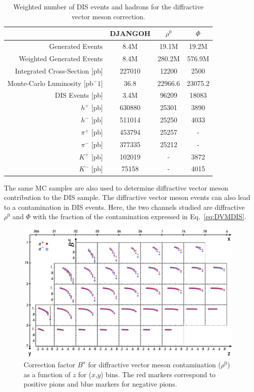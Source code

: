 \begin{table}
	\centering
	\begin{tabular}{rccc}
    \hline
     & DJANGOH & $\rho^0$ & $\Phi$ \\
    \hline
    Generated Events & 8.4M & 19.1M & 19.2M  \\
    Weighted Generated Events & 8.4M & 280.2M & 576.9M  \\
		Integrated Cross-Section [pb] & 227010 & 12200 & 2500  \\
		Monte-Carlo Luminosity [pb$^-1$] & 36.8 & 22966.6 & 23075.2  \\
    \hline
		DIS Events [pb] & 3.4M & 96209 & 18083  \\
		$h^+$ [pb] & 630880 & 25301 & 3890  \\
		$h^-$ [pb] & 511014 & 25250 & 4033  \\
		$\pi^+$ [pb] & 453794 & 25257 & -  \\
		$\pi^-$ [pb] & 377335 & 25212 & -  \\
		$K^+$ [pb] & 102019 & - & 3872  \\
		$K^-$ [pb] & 75158 & - & 4015 \\
  \end{tabular}
  \caption{Weighted number of DIS events and hadrons for the diffractive vector meson correction.}
  \label{DVM}
\end{table}

The same MC samples are also used to determine diffractive vector meson contribution to the DIS sample. The diffractive vector meson events can also lead to a contamination in DIS events. Here, the two channels studied are diffractive $\rho^0$ and $\Phi$ with the fraction of the contamination expressed in Eq.~\ref{eq:DVMDIS}.

\begin{figure}
  \centering
	\includegraphics[scale=0.8]{./gfx/DVMpi.png}
	\caption{Correction factor $B^{\pi}$ for diffractive vector meson contamination ($\rho^0$) as a function of $z$ for ($x$,$y$) bins. The red markers correspond to positive pions and blue markers for negative pions.}
	\label{DVMpi}
\end{figure}


